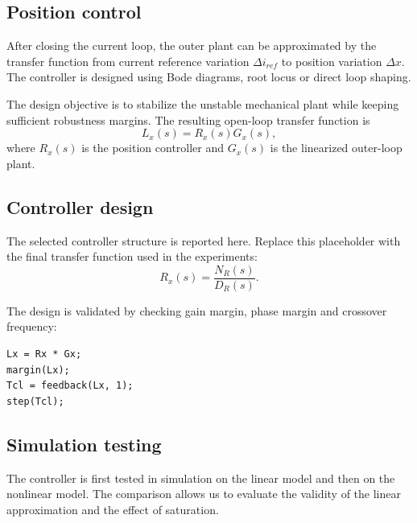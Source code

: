 \subsection{Position control}

After closing the current loop, the outer plant can be approximated by the transfer function from current reference variation $\Delta i_{ref}$ to position variation $\Delta x$. The controller is designed using Bode diagrams, root locus or direct loop shaping.

The design objective is to stabilize the unstable mechanical plant while keeping sufficient robustness margins. The resulting open-loop transfer function is
\begin{equation}
    L_x(s) = R_x(s)G_x(s),
\end{equation}
where $R_x(s)$ is the position controller and $G_x(s)$ is the linearized outer-loop plant.

\subsection{Controller design}

The selected controller structure is reported here. Replace this placeholder with the final transfer function used in the experiments:
\begin{equation}
    R_x(s) = \frac{N_R(s)}{D_R(s)}.
\end{equation}

The design is validated by checking gain margin, phase margin and crossover frequency:
\begin{lstlisting}[style=matlabstyle,caption={Frequency-based validation commands.}]
Lx = Rx * Gx;
margin(Lx);
Tcl = feedback(Lx, 1);
step(Tcl);
\end{lstlisting}

\subsection{Simulation testing}

The controller is first tested in simulation on the linear model and then on the nonlinear model. The comparison allows us to evaluate the validity of the linear approximation and the effect of saturation.



